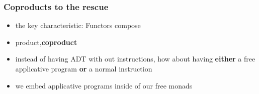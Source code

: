 \documentclass[compress]{beamer}
\begin{document}
\begin{frame}
  \frametitle{Coproducts to the rescue}
  \begin{itemize}
  \item the key characteristic: Functors compose
  \item product,\textbf{coproduct}
  \item instead of having ADT with out instructions, how about having
    \textbf{either} a free applicative program \textbf{or} a normal
    instruction
  \item we embed applicative programs inside of our free monads
  \end{itemize}
\end{frame}
\end{document}

